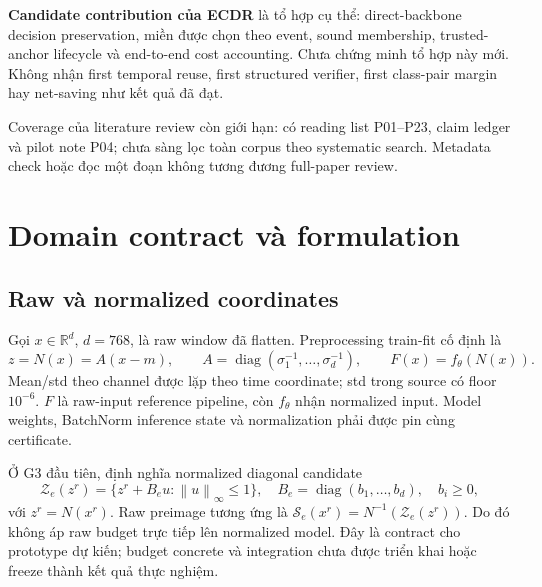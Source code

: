 \documentclass[11pt,a4paper]{article}
\newcommand{\R}{\mathbb{R}}
\newcommand{\Sset}{\mathcal{S}}
\newcommand{\Zset}{\mathcal{Z}}
\newcommand{\norm}[1]{\left\lVert #1\right\rVert}
\begin{document}
\textbf{Candidate contribution của ECDR} là tổ hợp cụ thể: direct-backbone
decision preservation, miền được chọn theo event, sound membership,
trusted-anchor lifecycle và end-to-end cost accounting. Chưa chứng minh
tổ hợp này mới. Không nhận first temporal reuse, first structured verifier,
first class-pair margin hay net-saving như kết quả đã đạt.

Coverage của literature review còn giới hạn: có reading list P01--P23,
claim ledger và pilot note P04; chưa sàng lọc toàn corpus theo systematic
search. Metadata check hoặc đọc một đoạn không tương đương full-paper review.

\section{Domain contract và formulation}
\subsection{Raw và normalized coordinates}
Gọi \(x\in\R^d\), \(d=768\), là raw window đã flatten.
Preprocessing train-fit cố định là
\begin{equation}
 z=N(x)=A(x-m),\qquad
 A=\operatorname{diag}(\sigma_1^{-1},\ldots,\sigma_d^{-1}),\qquad
 F(x)=f_\theta(N(x)).
\end{equation}
Mean/std theo channel được lặp theo time coordinate; std trong source có
floor \(10^{-6}\). \(F\) là raw-input reference pipeline, còn \(f_\theta\)
nhận normalized input. Model weights, BatchNorm inference state và
normalization phải được pin cùng certificate.

Ở G3 đầu tiên, định nghĩa normalized diagonal candidate
\begin{equation}\label{eq:diag}
 \Zset_e(z^r)=
 \{z^r+B_eu:\norm{u}_\infty\le1\},\quad
 B_e=\operatorname{diag}(b_1,\ldots,b_d),\quad b_i\ge0,
\end{equation}
với \(z^r=N(x^r)\). Raw preimage tương ứng là
\(\Sset_e(x^r)=N^{-1}(\Zset_e(z^r))\).
Do đó không áp raw budget trực tiếp lên normalized model.
Đây là contract cho prototype dự kiến; budget concrete và integration chưa
được triển khai hoặc freeze thành kết quả thực nghiệm.
\end{document}
